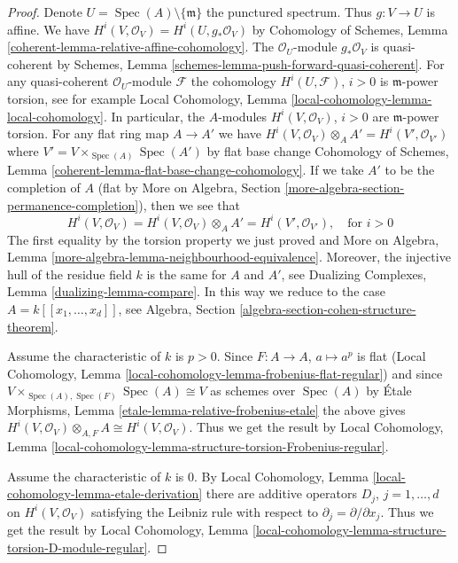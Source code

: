 \documentclass{stacks-project}
\theoremstyle{plain}
\theoremstyle{definition}
\theoremstyle{remark}
\numberwithin{equation}{subsection}
\def\Spec{\mathop{\mathrm{Spec}}}
\begin{document}
\begin{proof}
Denote $U = \Spec(A) \setminus \{\mathfrak m\}$ the punctured spectrum.
Thus $g : V \to U$ is affine.
We have $H^i(V, \mathcal{O}_V) = H^i(U, g_*\mathcal{O}_V)$ by
Cohomology of Schemes, Lemma \ref{coherent-lemma-relative-affine-cohomology}.
The $\mathcal{O}_U$-module $g_*\mathcal{O}_V$ is quasi-coherent by
Schemes, Lemma \ref{schemes-lemma-push-forward-quasi-coherent}.
For any quasi-coherent $\mathcal{O}_U$-module $\mathcal{F}$
the cohomology $H^i(U, \mathcal{F})$, $i > 0$
is $\mathfrak m$-power torsion, see for example
Local Cohomology, Lemma \ref{local-cohomology-lemma-local-cohomology}.
In particular, the $A$-modules $H^i(V, \mathcal{O}_V)$, $i > 0$
are $\mathfrak m$-power torsion.
For any flat ring map $A \to A'$ we have
$H^i(V, \mathcal{O}_V) \otimes_A A' = H^i(V', \mathcal{O}_{V'})$
where $V' = V \times_{\Spec(A)} \Spec(A')$ by flat base change
Cohomology of Schemes, Lemma \ref{coherent-lemma-flat-base-change-cohomology}.
If we take $A'$ to be the completion of $A$ (flat by
More on Algebra, Section \ref{more-algebra-section-permanence-completion}),
then we see that
$$
H^i(V, \mathcal{O}_V) = H^i(V, \mathcal{O}_V) \otimes_A A' =
H^i(V', \mathcal{O}_{V'}),\quad\text{for } i > 0
$$
The first equality by the torsion property we just proved and
More on Algebra, Lemma \ref{more-algebra-lemma-neighbourhood-equivalence}.
Moreover, the injective hull of the residue field $k$
is the same for $A$ and $A'$, see
Dualizing Complexes, Lemma \ref{dualizing-lemma-compare}.
In this way we reduce to the case $A = k[[x_1, \ldots, x_d]]$, see
Algebra, Section \ref{algebra-section-cohen-structure-theorem}.

\medskip\noindent
Assume the characteristic of $k$ is $p > 0$. Since $F : A \to A$,
$a \mapsto a^p$ is flat (Local Cohomology, Lemma
\ref{local-cohomology-lemma-frobenius-flat-regular})
and since $V \times_{\Spec(A), \Spec(F)} \Spec(A) \cong V$ as schemes
over $\Spec(A)$ by
\'Etale Morphisms, Lemma \ref{etale-lemma-relative-frobenius-etale}
the above gives
$H^i(V, \mathcal{O}_V) \otimes_{A, F} A \cong H^i(V, \mathcal{O}_V)$.
Thus we get the result by
Local Cohomology, Lemma
\ref{local-cohomology-lemma-structure-torsion-Frobenius-regular}.

\medskip\noindent
Assume the characteristic of $k$ is $0$. By
Local Cohomology, Lemma \ref{local-cohomology-lemma-etale-derivation}
there are additive operators $D_j$, $j = 1, \ldots, d$ on
$H^i(V, \mathcal{O}_V)$ satisfying the Leibniz rule with
respect to $\partial_j = \partial/\partial x_j$.
Thus we get the result by
Local Cohomology,
Lemma \ref{local-cohomology-lemma-structure-torsion-D-module-regular}.
\end{proof}
\end{document}
